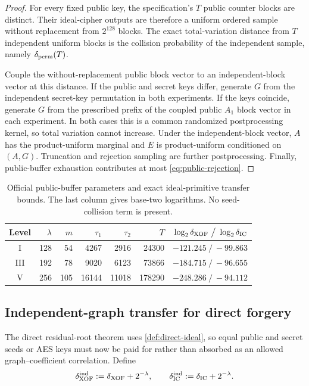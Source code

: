 \documentclass[11pt,a4paper]{article}
\theoremstyle{definition}
\theoremstyle{remark}
\begin{document}
\begin{proof}
For every fixed public key, the specification's $T$ public counter blocks are distinct.  Their ideal-cipher outputs are therefore a uniform ordered sample without replacement from $2^{128}$ blocks.  The exact total-variation distance from $T$ independent uniform blocks is the collision probability of the independent sample, namely $\delta_{\rm perm}(T)$.

Couple the without-replacement public block vector to an independent-block vector at this distance.  If the public and secret keys differ, generate $G$ from the independent secret-key permutation in both experiments.  If the keys coincide, generate $G$ from the prescribed prefix of the coupled public $A_1$ block vector in each experiment.  In both cases this is a common randomized postprocessing kernel, so total variation cannot increase.  Under the independent-block vector, $A$ has the product-uniform marginal and $E$ is product-uniform conditioned on $(A,G)$.  Truncation and rejection sampling are further postprocessing.  Finally, public-buffer exhaustion contributes at most \eqref{eq:public-rejection}.
\end{proof}

\begin{table}[t]
\centering
\small
\setlength{\tabcolsep}{4.3pt}
\caption{Official public-buffer parameters and exact ideal-primitive transfer bounds.  The last column gives base-two logarithms.  No seed-collision term is present.}
\label{tab:seeded-model-bounds}
\begin{tabular}{@{}c r r r r r r@{}}
\toprule
Level & $\lambda$ & $m$ & $\tau_1$ & $\tau_2$ & $T$ & $\log_2\delta_{\rm XOF}\ \big/\ \log_2\delta_{\rm IC}$\\
\midrule
I   &128&54 &4267 &2916 &24300  &$-121.245\ /\ -99.863$\\
III &192&78 &9020 &6123 &73866  &$-184.715\ /\ -96.655$\\
V   &256&105&16144&11018&178290 &$-248.286\ /\ -94.112$\\
\bottomrule
\end{tabular}
\end{table}


\subsection{Independent-graph transfer for direct forgery}

The direct residual-root theorem uses \cref{def:direct-ideal}, so equal public
and secret seeds or AES keys must now be paid for rather than absorbed as an
allowed graph--coefficient correlation.  Define
\begin{equation}\label{eq:direct-transfer-distances}
 \delta_{\rm XOF}^{\rm ind}:=\delta_{\rm XOF}+2^{-\lambda},
 \qquad
 \delta_{\rm IC}^{\rm ind}:=\delta_{\rm IC}+2^{-\lambda}.
\end{equation}
\end{document}
